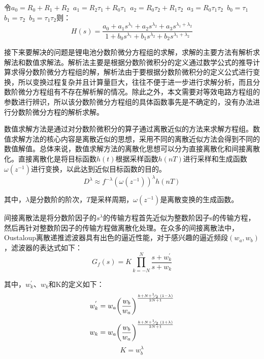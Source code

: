 令${{a}_{0}}={{R}_{0}}+{{R}_{1}}+{{R}_{2}}$~${{a}_{1}}={{R}_{2}}{{\tau }_{1}}+{{R}_{0}}{{\tau }_{1}}$~${{a}_{2}}={{R}_{0}}{{\tau }_{2}}+{{R}_{1}}{{\tau }_{2}}$~${{a}_{3}}={{R}_{0}}{{\tau }_{1}}{{\tau }_{2}}$~${{b}_{0}}={{\tau }_{1}}$~${{b}_{1}}={{\tau }_{2}}$~${{b}_{3}}={{\tau }_{1}}{{\tau }_{2}}$则：
\begin{equation}
H\left( s \right)=\frac{{{a}_{0}}+{{a}_{1}}{{s}^{{{\lambda }_{1}}}}+{{a}_{2}}{{s}^{{{\lambda }_{2}}}}+{{a}_{3}}{{s}^{{{\lambda }_{1}}+{{\lambda }_{2}}}}}{1+{{b}_{0}}{{s}^{{{\lambda }_{1}}}}+{{b}_{1}}{{s}^{{{\lambda }_{2}}}}+{{b}_{2}}{{s}^{{{\lambda }_{1}}+{{\lambda }_{2}}}}}
\end{equation}

接下来要解决的问题是锂电池分数阶微分方程组的求解，求解的主要方法有解析求解法和数值求解法。解析法主要是根据分数阶微积分的定义通过数学公式的推导计算求得分数阶微分方程组的解，解析法由于要根据分数阶微积分的定义公式进行变换，所以变换过程复杂并且计算量巨大，往往不便于进一步进行求解分析，而且分数阶微分方程组有不存在解析解的情况。除此之外，本文需要对等效电路方程组的参数进行辨识，所以该分数阶微分方程组的具体函数事先是不确定的，没有办法进行分数阶微分方程的解析求解。

数值求解方法是通过对分数阶微积分的算子通过离散近似的方法来求解方程组。数值求解方法的核心内容是离散近似的思想，采用不同的离散近似方法会得到不同的数值解值。总体来说，数值求解方法的离散化思想可以分为直接离散化和间接离散化。直接离散化是将目标函数$h\left( t \right)$根据采样函数$h\left( nT \right)$进行采样和生成函数$\omega \left( {{z}^{-1}} \right)$进行变换，以此达到近似目标函数的目的。
\begin{equation}
{{D}^{\lambda }}\approx {{f}^{-\lambda }}{{\left( \omega \left( {{z}^{-1}} \right) \right)}^{\lambda }}h\left( nT \right)
\end{equation}

其中，$\lambda $是分数阶的阶次，$T$是采样周期，$\omega \left( {{z}^{-1}} \right)$是离散变换的生成函数。

间接离散法是将分数阶因子的${{s}^{\lambda }}$的传输方程首先近似为整数阶因子s的传输方程，然后再针对整数阶因子的传输方程做离散化处理。在众多的间接离散法中，Oustaloup离散递推滤波器具有出色的逼近性能，对于感兴趣的逼近频段$\left( {{w}_{a}},{{w}_{b}} \right)$，滤波器的表达式如下：
\begin{equation}
{{G}_{f}}\left( s \right)=K\prod\limits_{k=-N}^{N}{\frac{s+w_{k}^{'}}{s+{{w}_{k}}}}
\end{equation}

其中，$w_{k}^{'}$、${{w}_{k}}$和K的定义如下：
\begin{equation}
w_{k}^{'}={{w}_{a}}{{\left( \frac{{{w}_{b}}}{{{w}_{a}}} \right)}^{\frac{k+N+{}^{1}\!\!\diagup\!\!{}_{2}\;\left( 1-\lambda  \right)}{2N+1}}}
\end{equation}
\begin{equation}
{{w}_{k}}={{w}_{a}}{{\left( \frac{{{w}_{b}}}{{{w}_{a}}} \right)}^{\frac{k+N+{}^{1}\!\!\diagup\!\!{}_{2}\;\left( 1+\lambda  \right)}{2N+1}}}
\end{equation}
\begin{equation}
K=w_{b}^{\lambda }
\end{equation}

